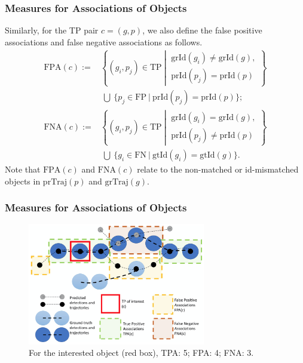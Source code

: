 \documentclass[slidetop, mathserif]{beamer}
\begin{document}
\begin{frame}
	\frametitle{Measures for Associations of Objects}
	
	Similarly, for the TP pair $c = (g, p)$, we also define the false positive associations
	and false negative associations as follows.
	\begin{align*}
		\text{FPA}(c) := &             
		\left\{(g_i, p_j)\in\text{TP}\ \left|\ 
		\begin{array}{c}
		\text{grId}(g_i) \neq \text{grId}(g), \\
		\text{prId}(p_j) = \text{prId}(p)
		\end{array}\right.
		\right\} \\
		                 & ~ \bigcup ~ 
		\Big\{p_j\in\text{FP}\ |\ 
		\text{prId}(p_j) = \text{prId}(p)
		\Big\}; \\
		\text{FNA}(c) := &             
		\left\{(g_i, p_j)\in\text{TP}\ \left|\ 
		\begin{array}{c}
		\text{grId}(g_i) = \text{grId}(g), \\
		\text{prId}(p_j) \neq \text{prId}(p)
		\end{array}\right.
		\right\} \\
		                 & ~ \bigcup ~ 
		\Big\{g_i\in\text{FN}\ |\ 
		\text{gtId}(g_i) = \text{gtId}(g)
		\Big\}.
	\end{align*}
	Note that $\text{FPA}(c)$ and $\text{FNA}(c)$ relate to the non-matched or id-mismatched
	objects in $\text{prTraj}(p)$ and $\text{grTraj}(g)$.
	
\end{frame}

\begin{frame}
	\frametitle{Measures for Associations of Objects}
	\begin{figure}
		\includegraphics[width=220pt]{pics/fig8.png}
		\caption{For the interested object (red box), TPA: 5; FPA: 4; FNA: 3.}
	\end{figure}
\end{frame}
\end{document}
